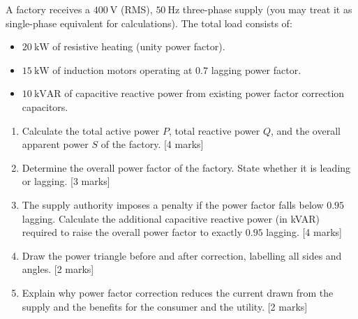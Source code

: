 \documentclass[11pt]{article}
\begin{document}
\begin{exercice}
A factory receives a $400\ \mathrm{V}$ (RMS), $50\ \mathrm{Hz}$ three-phase supply (you may treat it as single-phase equivalent for calculations). The total load consists of:
\begin{itemize}
\item $20\ \mathrm{kW}$ of resistive heating (unity power factor).
\item $15\ \mathrm{kW}$ of induction motors operating at $0.7$ lagging power factor.
\item $10\ \mathrm{kVAR}$ of capacitive reactive power from existing power factor correction capacitors.
\end{itemize}
\begin{enumerate}
\item Calculate the total active power $P$, total reactive power $Q$, and the overall apparent power $S$ of the factory. [4 marks]
\item Determine the overall power factor of the factory. State whether it is leading or lagging. [3 marks]
\item The supply authority imposes a penalty if the power factor falls below $0.95$ lagging. Calculate the additional capacitive reactive power (in kVAR) required to raise the overall power factor to exactly $0.95$ lagging. [4 marks]
\item Draw the power triangle before and after correction, labelling all sides and angles. [2 marks]
\item Explain why power factor correction reduces the current drawn from the supply and the benefits for the consumer and the utility. [2 marks]
\end{enumerate}
\end{exercice}
\end{document}
